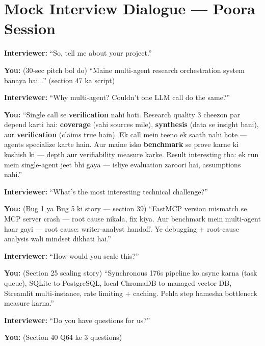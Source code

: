 \section{Mock Interview Dialogue --- Poora Session}

\begin{interviewbox}
\textbf{Interviewer:} ``So, tell me about your project.''

\textbf{You:} (30-sec pitch bol do) ``Maine multi-agent research orchestration system banaya hai...'' (section 47 ka script)

\textbf{Interviewer:} ``Why multi-agent? Couldn't one LLM call do the same?''

\textbf{You:} ``Single call se \textbf{verification} nahi hoti. Research quality 3 cheezon par depend karti hai: \textbf{coverage} (sahi sources mile), \textbf{synthesis} (data se insight bani), aur \textbf{verification} (claims true hain). Ek call mein teeno ek saath nahi hote --- agents specialize karte hain. Aur maine isko \textbf{benchmark} se prove karne ki koshish ki --- depth aur verifiability measure karke. Result interesting tha: ek run mein single-agent jeet bhi gaya --- isliye evaluation zaroori hai, assumptions nahi.''

\textbf{Interviewer:} ``What's the most interesting technical challenge?''

\textbf{You:} (Bug 1 ya Bug 5 ki story --- section 39) ``FastMCP version mismatch se MCP server crash --- root cause nikala, fix kiya. Aur benchmark mein multi-agent haar gayi --- root cause: writer-analyst handoff. Ye debugging + root-cause analysis wali mindset dikhati hai.''

\textbf{Interviewer:} ``How would you scale this?''

\textbf{You:} (Section 25 scaling story) ``Synchronous 176s pipeline ko async karna (task queue), SQLite to PostgreSQL, local ChromaDB to managed vector DB, Streamlit multi-instance, rate limiting + caching. Pehla step hamesha bottleneck measure karna.''

\textbf{Interviewer:} ``Do you have questions for us?''

\textbf{You:} (Section 40 Q64 ke 3 questions)
\end{interviewbox}

